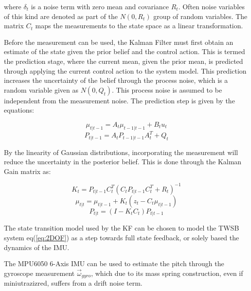         where $\delta_t$ is a noise term with zero mean and covariance $R_t$.  
        Often noise variables of this kind are denoted as part of the $N(0, R_t)$ group of random variables.
        The matrix $C_t$ maps the measurements to the state space as a linear transformation.

        Before the measurement can be used, the Kalman Filter must first obtain an estimate of the state given the 
        prior belief and the control action. This is termed the prediction stage, where the current mean, given the prior mean, 
        is predicted through applying the current control action to the system model. This prediction increases the uncertainty of the belief through the 
        process noise, which is a random variable given as $N(0, Q_t)$. This process noise is assumed to be independent from the measurement noise.
        The prediction step is given by the equations:

        \begin{equation}
            \mu_{t|t-1} = A_t \mu_{t-1|t-1} + B_t u_t
        \end{equation}
        \begin{equation}
            P_{t|t-1} = A_t P_{t-1|t-1} A_t^T + Q_t
        \end{equation}

        By the linearity of Gaussian distributions, incorporating the measurement will reduce the uncertainty in the posterior belief. 
        This is done through the Kalman Gain matrix as:

        \begin{equation}
            K_t = P_{t|t-1} C_t^T (C_t P_{t|t-1} C_t^T + R_t)^{-1}
        \end{equation}
        \begin{equation}
            \mu_{t|t} = \mu_{t|t-1} + K_t (z_t - C_t \mu_{t|t-1})
        \end{equation}
        \begin{equation}
            P_{t|t} = (I - K_t C_t) P_{t|t-1}
        \end{equation}

    
        The state transition model used by the KF can be chosen to model the TWSB system eq(\ref{eq:2DOF}) as a step towards 
        full state feedback, or solely based the dynamics of the IMU.
            
        The MPU6050 6-Axis IMU can be used to  estimate the pitch through the 
        gyroscope measurement $\vec\omega_{gyro}$, which due to its mass spring construction, even if miniutrazizred, suffers from a drift noise term. 

